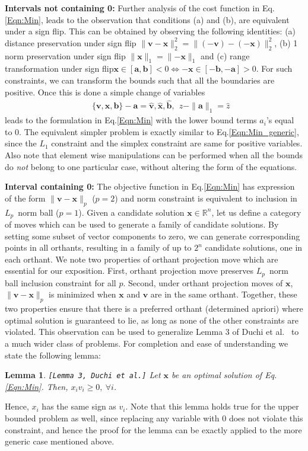 \documentclass{article}
\newtheorem{lemma}{Lemma}
\def\Lp{$L_p$~}
\begin{document}
\textbf{Intervals not containing 0: }
Further analysis of the cost function in Eq.\eqref{Eqn:Min}, leads to the observation that conditions (a) and (b), are equivalent under a sign flip. This can be obtained by observing the following identities: (a) distance preservation under sign flip  $\|\mathbf{v-x}\|_2^2 = \|\mathbf{(-v)-(-x)}\|_2^2$, (b) 1 norm preservation under sign flip $\|\mathbf{x}\|_1 = \|\mathbf{-x}\|_1$ and (c) range transformation under sign flip$\mathbf{x}\in [\mathbf{a,b}]<0 \Leftrightarrow \mathbf{-x}\in [\mathbf{-b,-a}]>0$.
For such constraints, we can transform the bounds such that all the boundaries are positive.
Once this is done a simple change of variables
\begin{eqnarray}
  && \mathbf{\{v,x,b\} - a} = \mathbf{\hat{v},\hat{x},\hat{b}},~~ z - \|\mathbf{a}\|_1 = \hat{z}
\end{eqnarray}
leads to the formulation in Eq.\eqref{Eqn:Min} with the lower bound terms $a_i$'s equal to 0. The equivalent simpler problem is exactly similar to Eq.\eqref{Eqn:Min_generic}, since the $L_1$ constraint and the simplex constraint are same for positive variables. Also note that
element wise manipulations can be performed when all the bounds do \textit{not} belong to one particular case, without altering the form of the equations.

{\textbf{Interval containing 0: }}
The objective function in Eq.\eqref{Eqn:Min} has expression of the form $ \| \mathbf{v} - \mathbf{x} \| _p$ ($p=2$) and norm constraint is equivalent to inclusion in \Lp norm ball ($p=1$). Given a candidate solution $ \mathbf{x} \in \mathbb{R}^n $, let us define a category of moves which can be used to generate a family of candidate solutions.
By setting some subset of vector components to zero, we can generate corresponding points in all orthants, resulting in a family of  up to $2^n$ candidate solutions, one in each orthant. We note two properties of orthant projection move which are essential for our exposition. First, orthant projection move preserves \Lp norm ball inclusion constraint for all $p$. Second, under orthant projection moves of $ \mathbf{x} $, $ \| \mathbf{v} - \mathbf{x} \|_p$ is minimized when $ \mathbf{x} $ and $ \mathbf{v} $ are in the same orthant.  Together, these two properties ensure that there is a preferred orthant (determined apriori) where optimal solution is guaranteed to lie, as long as none of the other constraints are violated. This observation can be used to generalize Lemma 3 of Duchi et al.~\cite{Duchi08} to a much wider class of problems. For completion and ease of understanding we state the following lemma:
\begin{lemma}\label{Lemma:Duchi3}
\texttt{[Lemma 3, Duchi et al.\cite{Duchi08}]} Let $\mathbf{x}$ be an optimal solution of Eq.\eqref{Eqn:Min}. Then,
$x_i v_i \ge 0,~\forall i$.
\end{lemma}
Hence, $x_i$ has the same sign as $v_i$. Note that this lemma holds true for the upper bounded problem as well, since replacing any variable with 0 does not violate this constraint, and hence the proof for the lemma can be exactly applied to the more generic case mentioned above.
\end{document}
